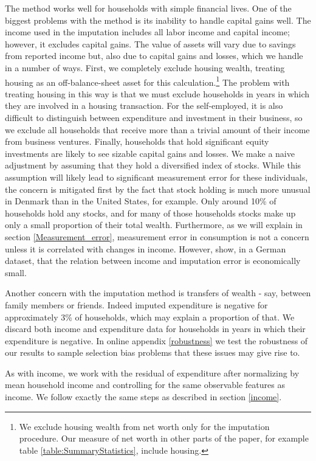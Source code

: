 \documentclass[titlepage]{\econtex}\newcommand{\texname}{ConsumptionHeterogeneity}
\begin{document}
The method works well for households with simple financial lives. One of the biggest problems with the method is its inability to handle capital gains well. The income used in the imputation includes all labor income and capital income; however, it excludes capital gains. The value of assets will vary due to savings from reported income but, also due to capital gains and losses, which we handle in a number of ways. First, we completely exclude housing wealth, treating housing as an off-balance-sheet asset for this calculation.\footnote{We exclude housing wealth from net worth only for the imputation procedure. Our measure of net worth in other parts of the paper, for example table \ref{table:SummaryStatistics}, include housing.} The problem with treating housing in this way is that we must exclude households in years in which they are involved in a housing transaction. For the self-employed, it is also difficult to distinguish between expenditure and investment in their business, so we exclude all households that receive more than a trivial amount of their income from business ventures. Finally, households that hold significant equity investments are likely to see sizable capital gains and losses. We make a naive adjustment by assuming that they hold a diversified index of stocks. While this assumption will likely lead to significant measurement error for these individuals, the concern is mitigated first by the fact that stock holding is much more unusual in Denmark than in the United States, for example. Only around 10\% of households hold any stocks, and for many of those households stocks make up only a small proportion of their total wealth. Furthermore, as we will explain in section \ref{Measurement_error}, measurement error in consumption is not a concern unless it is correlated with changes in income. However, \cite{baker_measurement_2018} show, in a German dataset, that the relation between income and imputation error is economically small. 

Another concern with the imputation method is transfers of wealth - say, between family members or friends. Indeed imputed expenditure is negative for approximately 3\% of households, which may explain a proportion of that. We discard both income and expenditure data for households in years in which their expenditure is negative. In online appendix \ref{robustness} we test the robustness of our results to sample selection bias problems that these issues may give rise to.

As with income, we work with the residual of expenditure after normalizing by mean household income and controlling for the same observable features as income. We follow exactly the same steps as described in section \ref{income}.
\end{document}
